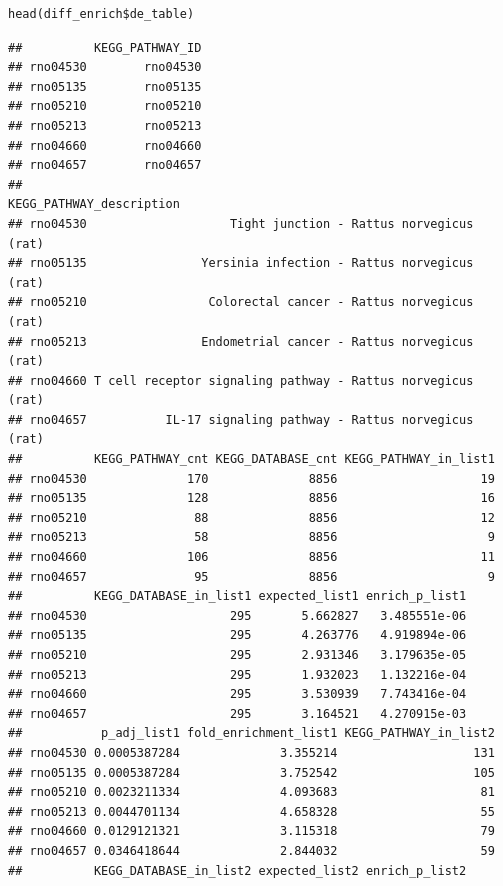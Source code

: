 \documentclass[article]{jss}\usepackage[]{graphicx}\usepackage[]{color}
\makeatletter
\newenvironment{kframe}{%
 \def\at@end@of@kframe{}%
 \ifinner\ifhmode%
  \def\at@end@of@kframe{\end{minipage}}%
  \begin{minipage}{\columnwidth}%
 \fi\fi%
 \def\FrameCommand##1{\hskip\@totalleftmargin \hskip-\fboxsep
 \colorbox{shadecolor}{##1}\hskip-\fboxsep
     \hskip-\linewidth \hskip-\@totalleftmargin \hskip\columnwidth}%
 \MakeFramed {\advance\hsize-\width
   \@totalleftmargin\z@ \linewidth\hsize
   \@setminipage}}%
 {\par\unskip\endMakeFramed%
 \at@end@of@kframe}
\newenvironment{knitrout}{}{} %
\makeatother
\begin{document}
\begin{knitrout}
\color{fgcolor}\begin{kframe}
\begin{lstlisting}[basicstyle=\ttfamily,breaklines=true]
head(diff_enrich$de_table)\end{lstlisting}
\begin{lstlisting}[basicstyle=\ttfamily,breaklines=true]
##          KEGG_PATHWAY_ID
## rno04530        rno04530
## rno05135        rno05135
## rno05210        rno05210
## rno05213        rno05213
## rno04660        rno04660
## rno04657        rno04657
##                                             KEGG_PATHWAY_description
## rno04530                    Tight junction - Rattus norvegicus (rat)
## rno05135                Yersinia infection - Rattus norvegicus (rat)
## rno05210                 Colorectal cancer - Rattus norvegicus (rat)
## rno05213                Endometrial cancer - Rattus norvegicus (rat)
## rno04660 T cell receptor signaling pathway - Rattus norvegicus (rat)
## rno04657           IL-17 signaling pathway - Rattus norvegicus (rat)
##          KEGG_PATHWAY_cnt KEGG_DATABASE_cnt KEGG_PATHWAY_in_list1
## rno04530              170              8856                    19
## rno05135              128              8856                    16
## rno05210               88              8856                    12
## rno05213               58              8856                     9
## rno04660              106              8856                    11
## rno04657               95              8856                     9
##          KEGG_DATABASE_in_list1 expected_list1 enrich_p_list1
## rno04530                    295       5.662827   3.485551e-06
## rno05135                    295       4.263776   4.919894e-06
## rno05210                    295       2.931346   3.179635e-05
## rno05213                    295       1.932023   1.132216e-04
## rno04660                    295       3.530939   7.743416e-04
## rno04657                    295       3.164521   4.270915e-03
##           p_adj_list1 fold_enrichment_list1 KEGG_PATHWAY_in_list2
## rno04530 0.0005387284              3.355214                   131
## rno05135 0.0005387284              3.752542                   105
## rno05210 0.0023211334              4.093683                    81
## rno05213 0.0044701134              4.658328                    55
## rno04660 0.0129121321              3.115318                    79
## rno04657 0.0346418644              2.844032                    59
##          KEGG_DATABASE_in_list2 expected_list2 enrich_p_list2

\end{lstlisting}
\end{kframe}
\end{knitrout}
\end{document}
